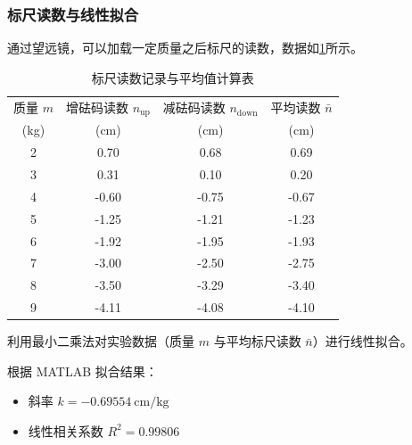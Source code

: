 \documentclass{../template/Report}%
\begin{document}
\begin{fullreportonly}
    \subsubsection{标尺读数与线性拟合}
    通过望远镜，可以加载一定质量之后标尺的读数，数据如\cref{tab:avg}所示。
    \begin{table}[H]
        \centering
        \caption{标尺读数记录与平均值计算表}
        \label{tab:avg}
        \begin{tabular}{cccc}
            \toprule
            {质量 $m$}            & {增砝码读数 $n_{\text{up}}$} & {减砝码读数 $n_{\text{down}}$} & {平均读数 $\bar{n}$}      \\
            {(\si{\kilo\gram})} & {(\si{\centi\meter})}   & {(\si{\centi\meter})}     & {(\si{\centi\meter})} \\
            \midrule
            2                   & 0.70                    & 0.68                      & 0.69                  \\
            3                   & 0.31                    & 0.10                      & 0.20                  \\
            4                   & -0.60                   & -0.75                     & -0.67                 \\
            5                   & -1.25                   & -1.21                     & -1.23                 \\
            6                   & -1.92                   & -1.95                     & -1.93                 \\
            7                   & -3.00                   & -2.50                     & -2.75                 \\
            8                   & -3.50                   & -3.29                     & -3.40                 \\
            9                   & -4.11                   & -4.08                     & -4.10                 \\
            \bottomrule
        \end{tabular}
    \end{table}

    利用最小二乘法对实验数据（质量 $m$ 与平均标尺读数 $\bar{n}$）进行线性拟合。

    根据 MATLAB 拟合结果：
    \begin{itemize}
        \item 斜率 $k = \SI{-0.69554}{\centi\meter\per\kilo\gram}$
        \item 线性相关系数 $R^2 = 0.99806$
    \end{itemize}


\end{fullreportonly}
\end{document}
